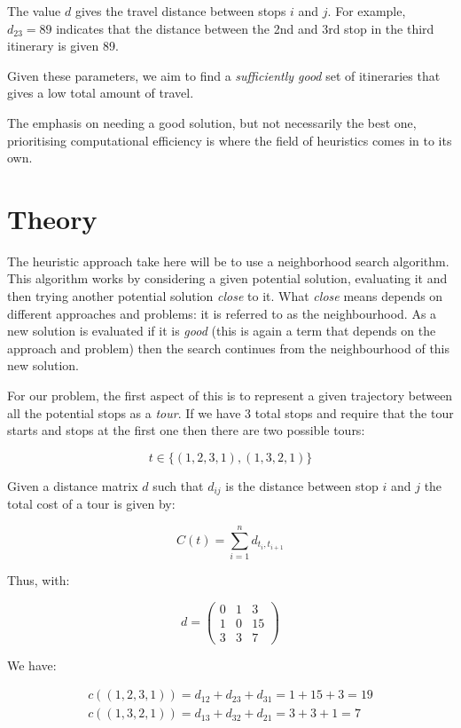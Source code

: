The value \(d\) gives the travel distance between
stops \(i\) and \(j\). For example, \(d_{23}=89\) %
indicates that the distance between the 2nd and 3rd stop in the third itinerary
is given 89. %

Given these parameters, we aim to find a \emph{sufficiently good} set of
itineraries that gives a low total amount of travel.

The emphasis on needing a good solution, but not necessarily the best one,
prioritising computational efficiency is where the field of heuristics comes in
to its own.

\section{Theory}\label{sec:theory}

The heuristic approach take here will be to use a neighborhood search algorithm.
This algorithm works by considering a given potential solution, evaluating it
and then trying another potential solution \emph{close} to it. What \emph{close}
means depends on different approaches and problems: it is referred to as the
neighbourhood. As a new solution is evaluated if it is \emph{good} (this is
again a term that depends on the approach and problem) then the search
continues from the neighbourhood of this new solution.

For our problem,
the first aspect of this is to represent a given trajectory between all the
potential stops as a \emph{tour}. If we have 3 total stops and require that the
tour starts and stops at the first one then there are two possible tours:

\[
    t \in \{(1, 2, 3, 1), (1, 3, 2, 1)\}
\]

Given a distance matrix \(d\) such that \(d_{ij}\) is the distance between stop
\(i\) and \(j\) the total cost of a tour is given by:

\[
    C(t)=\sum_{i=1}^{n} d_{t_i, t_{i + 1}}
\]

Thus, with:

\[
    d = \begin{pmatrix}
        0 & 1 & 3\\
        1 & 0 & 15\\
        3 & 3 & 7
        \end{pmatrix}
\]

We have:

\begin{eqnarray*}
    c((1, 2, 3, 1)) = d_{12} + d_{23} + d_{31} = 1 + 15 + 3 = 19\\
    c((1, 3, 2, 1)) = d_{13} + d_{32} + d_{21} = 3 + 3 + 1 = 7
\end{eqnarray*}

